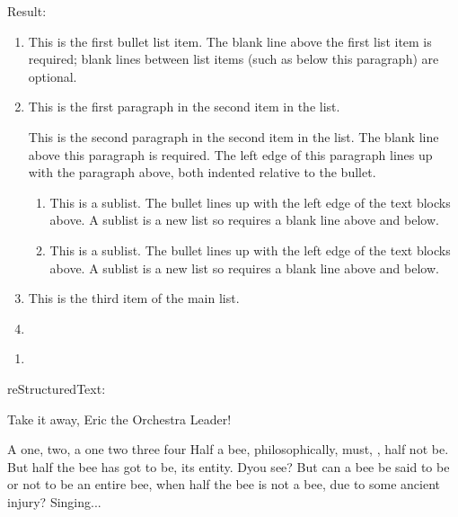 \documentclass[letterpaper,11pt,english]{sphinxmanual}
\begin{document}
Result:
\begin{enumerate}
\def\theenumi{\arabic{enumi}}
\def\labelenumi{\theenumi .}
\makeatletter\def\p@enumii{\p@enumi \theenumi .}\makeatother
\item {} 
This is the first bullet list item.  The blank line above the
first list item is required; blank lines between list items
(such as below this paragraph) are optional.

\item {} 
This is the first paragraph in the second item in the list.

This is the second paragraph in the second item in the list.
The blank line above this paragraph is required.  The left edge
of this paragraph lines up with the paragraph above, both
indented relative to the bullet.
\begin{enumerate}
\def\theenumii{\alph{enumii}}
\def\labelenumii{\theenumii .}
\makeatletter\def\p@enumiii{\p@enumii \theenumii .}\makeatother
\item {} 
This is a sublist.  The bullet lines up with the left edge of
the text blocks above.  A sublist is a new list so requires a
blank line above and below.

\item {} 
This is a sublist.  The bullet lines up with the left edge of
the text blocks above.  A sublist is a new list so requires a
blank line above and below.

\end{enumerate}

\item {} 
This is the third item of the main list.

\item {} 

\end{enumerate}
\begin{enumerate}
\def\theenumi{\alph{enumi}}
\def\labelenumi{\theenumi .}
\makeatletter\def\p@enumii{\p@enumi \theenumi .}\makeatother
\item {} 

\end{enumerate}

reStructuredText:

\begin{sphinxVerbatim}[commandchars=\\\{\}]
Take it away, Eric the Orchestra Leader!

     A one, two, a one two three four
    \textbar{}
     Half a bee, philosophically,
         must, , half not be.
     But half the bee has got to be,
          its entity.  D\PYGZsq{}you see?
    \textbar{}
     But can a bee be said to be
         or not to be an entire bee,
             when half the bee is not a bee,
                 due to some ancient injury?
    \textbar{}
     Singing...
\end{sphinxVerbatim}
\end{document}
